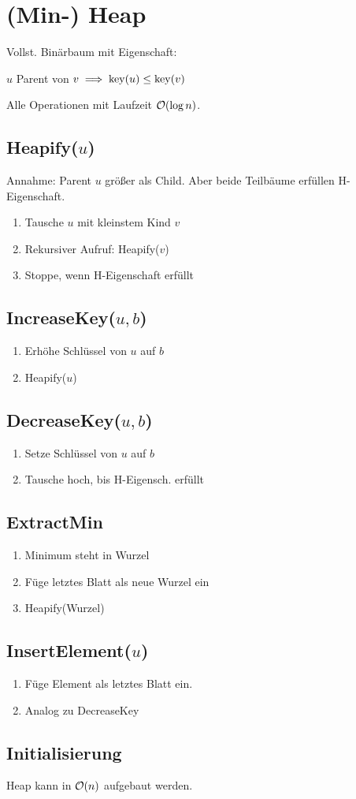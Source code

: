 \section*{(Min-) Heap}
Vollst. Binärbaum mit Eigenschaft:

$u$ Parent von $v \implies \operatorname{key}(u) \le \operatorname{key}(v)$

Alle Operationen mit Laufzeit $\mathcal{O}(\log n)$.

\subsection*{Heapify($u$)}
Annahme: Parent $u$ größer als Child.
Aber beide Teilbäume erfüllen H-Eigenschaft.
\begin{enumerate}
	\item Tausche $u$ mit kleinstem Kind $v$
	\item Rekursiver Aufruf: Heapify($v$)
	\item Stoppe, wenn H-Eigenschaft erfüllt
\end{enumerate}

\subsection*{IncreaseKey($u,b$)}
\begin{enumerate}
	\item Erhöhe Schlüssel von $u$ auf $b$
	\item Heapify($u$)
\end{enumerate}

\subsection*{DecreaseKey($u,b$)}
\begin{enumerate}
	\item Setze Schlüssel von $u$ auf $b$
	\item Tausche hoch, bis H-Eigensch. erfüllt
\end{enumerate}

\subsection*{ExtractMin}
\begin{enumerate}
	\item Minimum steht in Wurzel
	\item Füge letztes Blatt als neue Wurzel ein
	\item Heapify(Wurzel)
\end{enumerate}

\subsection*{InsertElement($u$)}
\begin{enumerate}
	\item Füge Element als letztes Blatt ein.
	\item Analog zu DecreaseKey
\end{enumerate}

\subsection*{Initialisierung}
Heap kann in $\mathcal{O}(n)$ aufgebaut werden.
